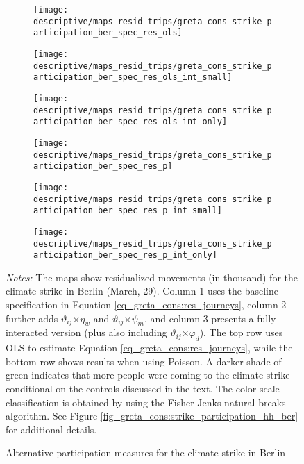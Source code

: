 \vspace*{\fill}\clearpage
\vspace*{\fill}
	\begin{figure}[H]\centering
		\begin{subfigure}[h]{0.32\linewidth}\centering
			\texttt{[image: descriptive/maps\_resid\_trips/greta\_cons\_strike\_participation\_ber\_spec\_res\_ols]}
		\end{subfigure}
		\begin{subfigure}[h]{0.32\linewidth}\centering
			\texttt{[image: descriptive/maps\_resid\_trips/greta\_cons\_strike\_participation\_ber\_spec\_res\_ols\_int\_small]}
		\end{subfigure}
		\begin{subfigure}[h]{0.32\linewidth}\centering
			\texttt{[image: descriptive/maps\_resid\_trips/greta\_cons\_strike\_participation\_ber\_spec\_res\_ols\_int\_only]}
		\end{subfigure}
		
		\begin{subfigure}[h]{0.32\linewidth}\centering
			\texttt{[image: descriptive/maps\_resid\_trips/greta\_cons\_strike\_participation\_ber\_spec\_res\_p]}
		\end{subfigure}
		\begin{subfigure}[h]{0.32\linewidth}\centering
			\texttt{[image: descriptive/maps\_resid\_trips/greta\_cons\_strike\_participation\_ber\_spec\_res\_p\_int\_small]}
		\end{subfigure}
		\begin{subfigure}[h]{0.32\linewidth}\centering
			\texttt{[image: descriptive/maps\_resid\_trips/greta\_cons\_strike\_participation\_ber\_spec\_res\_p\_int\_only]}
		\end{subfigure}
		\begin{minipage}{\linewidth}
			\caption{Alternative participation measures for the climate strike in Berlin}
			\label{fig_greta_cons:strike_participation_ber_different_measure}
			\scriptsize{\emph{Notes:} The maps show residualized movements (in thousand) for the climate strike in Berlin (March, 29). Column 1 uses the baseline specification in Equation \ref{eq_greta_cons:res_journeys}, column 2 further adds $\vartheta_{ij}$$\times\eta_w$ and  $\vartheta_{ij}$$\times\psi_m$, and column 3 presents a fully interacted version (plus also including $\vartheta_{ij}$$\times\varphi_d$). The top row uses OLS to estimate Equation \ref{eq_greta_cons:res_journeys}, while the bottom row shows results when using Poisson. A darker shade of green indicates that more people were coming to the climate strike conditional on the controls discussed in the text. The color scale classification is obtained by using the Fisher-Jenks natural breaks algorithm. See Figure \ref{fig_greta_cons:strike_participation_hh_ber} for additional details.}
		\end{minipage}
	\end{figure}
